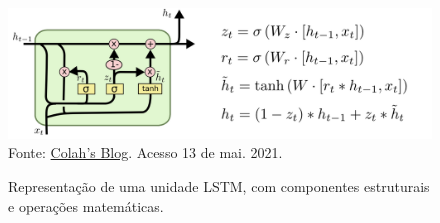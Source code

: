 \begin{figure}[hbt]
\centering
\caption{Representação de uma unidade LSTM, com componentes estruturais e operações matemáticas.}
  \includegraphics[scale=0.56]{figures/lstm.png} \\
  Fonte: \href{http://colah.github.io/posts/2015-08-Understanding-LSTMs/}{Colah's Blog}. Acesso 13 de mai. 2021.
\end{figure}